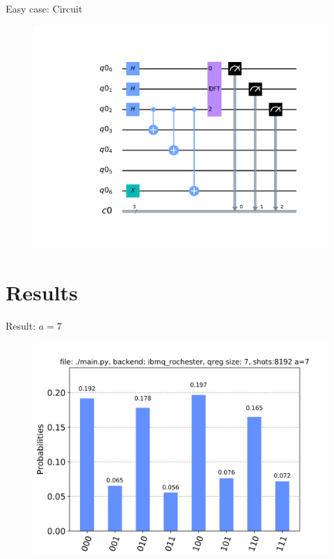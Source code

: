 \documentclass{beamer}
\begin{document}
\begin{frame}{Easy case: Circuit}
	\begin{figure}[h]
		\centering
		\includegraphics[width=\linewidth]{./figs/11circuit.pdf}
	\end{figure}
\end{frame}


\section{Results}%
\label{sec:results}

\begin{frame}{Result: $a=7$}
	\begin{figure}[h]
		\centering
		\includegraphics[width=0.8\linewidth]{./figs/15_7.png}
	\end{figure}
\end{frame}
\end{document}
